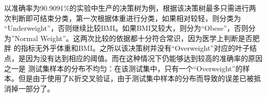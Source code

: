 \documentclass[a4paper,11pt]{article}%
\theoremstyle{remark}
\theoremstyle{remark}
\theoremstyle{definition}
\theoremstyle{definition}
\theoremstyle{definition}
\begin{document}
以准确率为90.9091\%的实验中生产的决策树为例，根据该决策树最多只需进行两次判断即可结束分类，第一次根据体重进行分类，如果相对较轻，则分类为
“Underweight”，否则继续比较BMI。如果BMI又较大，则分为“Obese”，否则分为”Normal Weight”。这两次比较的依据都十分符合常识，因为医学上判断是否肥胖
的指标无外乎体重和BMI。之所以该决策树并没有“Overweight”对应的叶子结点，是因为没有达到相应的阈值。而在这种情况下仍能够达到较高的准确率的原因之一是
测试集样本的分布不均匀：在该测试集中，只有一个“Overweight”的样本。但是由于使用了K折交叉验证，由于测试集中样本的分布而导致的误差已被抵消掉一部分了。
\end{document}
